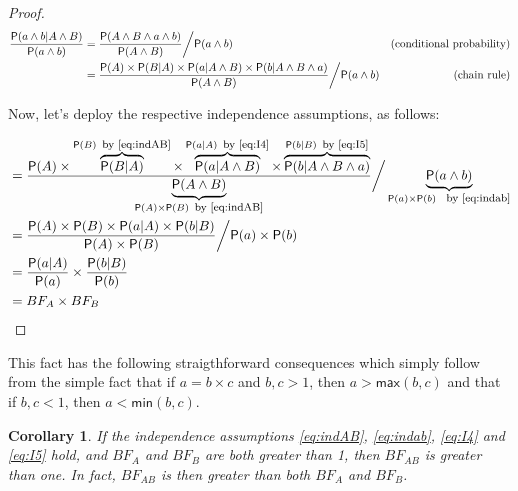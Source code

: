 \documentclass[
  10pt,
  dvipsnames,enabledeprecatedfontcommands]{scrartcl}
\newcommand{\et}{\wedge}
\newcommand{\pr}[1]{\ensuremath{\mathsf{P}(#1)}}
\newtheorem{corollary}{Corollary}[fact]
\begin{document}
\begin{proof}

\begin{align*}
\frac{\pr{a \wedge b\vert A\wedge B}}{\pr{a \wedge b}} & = \frac{\pr{A \et B\et a\wedge b}}{\pr{A \et B}} \bigg/ \pr{a \wedge b}
&\mbox{(conditional probability)} \\
&  = \frac{\pr{A} \times \pr {B \vert A}  \times \pr{a \vert A \et B} \times \pr{b \vert A \et B \et a}}{\pr{A \et B}} \bigg/ \pr{a \wedge b}
&\mbox{\,\,\,\,\,\,\, (chain rule)} \\
\end{align*}

\noindent Now, let's deploy the respective independence assumptions, as follows:

\begin{align*}
&  = \frac{\pr{A} \times \overbrace{\pr {B \vert A}}^{ \pr{B} \mbox{\footnotesize \, by \eqref{eq:indAB}}}  \times
\overbrace{\pr{a \vert A \et B}}^{\pr{a \vert A} \mbox{\footnotesize \, by \eqref{eq:I4}}}
\times \overbrace{\pr{b \vert A \et B \et a}}^{\pr{b \vert B} \mbox{\footnotesize \, by \eqref{eq:I5}}}
}{\underbrace{\pr{A \et B}}_{\pr{A} \times \pr{B} \mbox{\footnotesize \, by \eqref{eq:indAB}}}} \bigg/ \underbrace{\pr{a \wedge b}}_{\pr{a}\times \pr{b} \mbox{ \footnotesize \, by \eqref{eq:indab}}} \\
&  = \frac{\pr{A} \times  \pr{B}   \times \pr{a \vert A}  \times  \pr{b \vert B}}
{\pr{A} \times \pr{B}} \bigg/ \pr{a}\times \pr{b} \\
& = \frac{\pr{a \vert A}  }{\pr{a}}  \times \frac{\pr{b \vert B}}{\pr{b}} \\
& = BF_{A} \times BF_B
\end{align*}

\end{proof}

This fact has the following straigthforward consequences which simply
follow from the simple fact that if \(a = b \times c\) and \(b, c>1\),
then \(a > \mathsf{max}(b,c)\) and that if \(b, c<1\), then
\(a < \mathsf{min}(b,c)\).

\begin{corollary} If the independence assumptions \eqref{eq:indAB}, \eqref{eq:indab}, \eqref{eq:I4} and \eqref{eq:I5} hold, and $BF_{A}$ and $BF_{B}$ are both greater than 1, then $BF_{AB}$ is greater than one. In fact,  $BF_{AB}$ is then greater than both  $BF_{A}$ and $BF_{B}$. \label{cor:BFind2}
\end{corollary}
\end{document}
